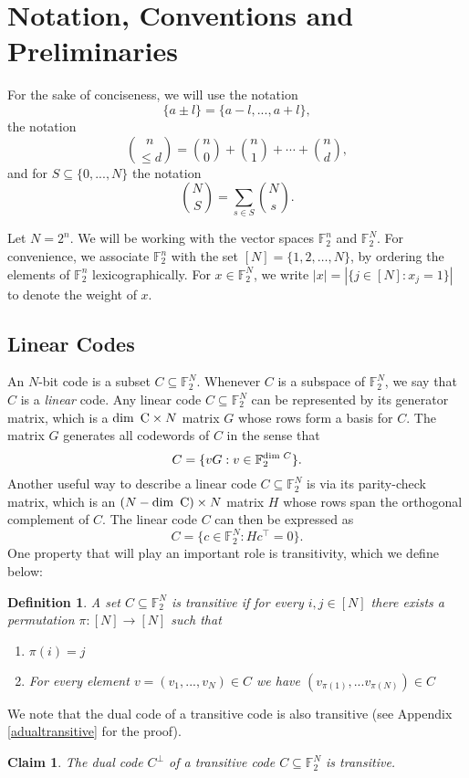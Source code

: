 \documentclass[12pt]{article}
\newtheorem{claim}[theorem]{Claim}
\newtheorem{definition}{Definition}
\newcommand{\F}{\mathbb{F}}
\begin{document}
\section{Notation, Conventions and Preliminaries}\label{prelim}

For the sake of conciseness, we will use the notation
$$\{a\pm l\}=\{a-l,...,a+l\},$$
the notation 
$$\binom{n}{\leq d} =\binom{n}{0} + \binom{n}{1} + \dotsb + \binom{n}{d},$$
and for $S\subseteq\{0,...,N\}$ the notation
$$\binom{N}{S}=\sum_{s\in S}\binom{N}{s}.$$


Let $N = 2^n$. 
We will be working with the vector spaces $\F_2^n$ and $\F_2^N$. For convenience, we associate $\F_2^n$ with the set $[N] = \{1,2,\dotsc, N\}$, by ordering the elements of $\F_2^n$ lexicographically. 
For $x \in \F_2^N$, we write $|x| = |\{j \in [N]: x_j=1\}|$ to denote the weight of $x$. 

\subsection{Linear Codes}
An $N$-bit code is a subset $C\subseteq\mathbb{F}_2^N$. Whenever $C$ is a subspace of $\mathbb{F}_2^N$, we say that $C$ is a \emph{linear} code. Any linear code $C\subseteq\mathbb{F}_2^N$ can be represented by its generator matrix, which is a $\dim\textnormal{ C}\times N$ matrix $G$ whose rows form a basis for $C$. The matrix $G$ generates all codewords of $C$ in the sense that
$$C=\{vG:v\in\mathbb{F}_2^{\textnormal{dim }C}\}.$$
Another useful way to describe a linear code $C\subseteq \mathbb{F}_2^N$ is via its parity-check matrix, which is an $(N-\dim\textnormal{ C})\times N$ matrix $H$ whose rows span the orthogonal complement of $C$. The linear code $C$ can then be expressed as 
$$C=\{c\in\mathbb{F}_2^N:Hc^\intercal=0\}.$$
One property that will play an important role is transitivity, which we define below:
\begin{definition}\label{deftransitive}
A set $C\subseteq \mathbb{F}_2^N$ is transitive if for every $i,j\in[N]$ there exists a permutation $\pi:[N]\rightarrow [N]$ such that \begin{enumerate}[label=(\roman*)]
    \item $\pi(i)=j$
    \item For every element $v=(v_1,...,v_N)\in C$ we have $(v_{\pi(1)},...v_{\pi(N)})\in C$
\end{enumerate}
\end{definition}
We note that the dual code of a transitive code is also transitive (see Appendix \ref{adualtransitive} for the proof).
\begin{claim}\label{dualtransitive}
The dual code $C^\perp$ of a transitive code $C\subseteq\F_2^N$ is transitive.
\end{claim}
\end{document}
